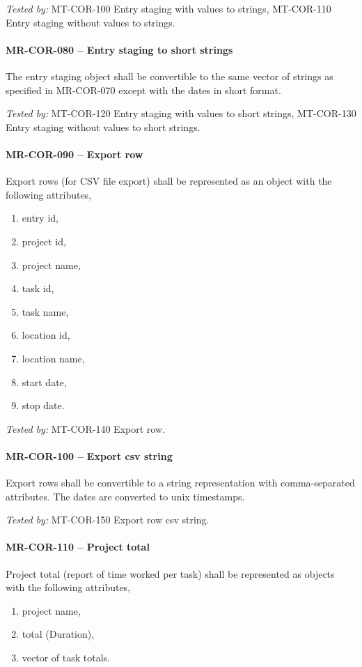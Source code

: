 \textit{Tested by: } MT-COR-100 Entry staging with values to strings,
MT-COR-110 Entry staging without values to strings.

\paragraph{MR-COR-080 -- Entry staging to short strings}
The entry staging object shall be convertible to the same vector
of strings as specified in MR-COR-070 except with the dates in short
format.

\textit{Tested by: } MT-COR-120 Entry staging with values to short strings,
MT-COR-130 Entry staging without values to short strings.

\paragraph{MR-COR-090 -- Export row}
Export rows (for CSV file export) shall be represented as an object
with the following attributes,
\begin{enumerate}
\item entry id,
\item project id,
\item project name,
\item task id,
\item task name,
\item location id,
\item location name,
\item start date,
\item stop date.
\end{enumerate}

\textit{Tested by: } MT-COR-140 Export row.

\paragraph{MR-COR-100 -- Export csv string}
Export rows shall be convertible to a string representation with
comma-separated attributes. The dates are converted to unix timestamps.

\textit{Tested by: } MT-COR-150 Export row csv string.

\paragraph{MR-COR-110 -- Project total}
Project total (report of time worked per task) shall be represented
as objects with the following attributes,
\begin{enumerate}
\item project name,
\item total (Duration),
\item vector of task totals.
\end{enumerate}

